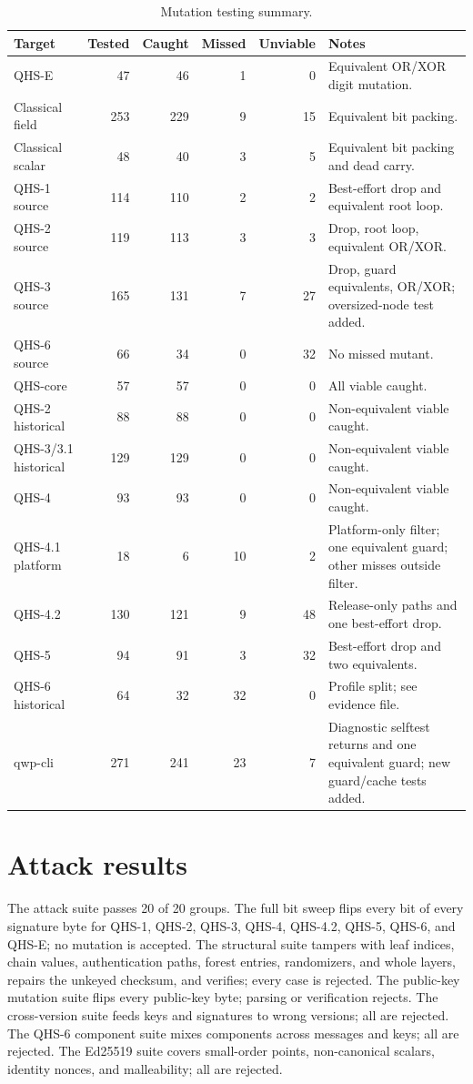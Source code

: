 \documentclass[11pt,a4paper]{article}
\theoremstyle{remark}
\begin{document}
\begin{table}[ht]
\centering
\caption{Mutation testing summary.}
\label{tab:mutation}
\small
\begin{tabularx}{\textwidth}{@{}l r r r r X@{}}
\toprule
Target & Tested & Caught & Missed & Unviable & Notes\\
\midrule
QHS-E & 47 & 46 & 1 & 0 & Equivalent OR/XOR digit mutation.\\
Classical field & 253 & 229 & 9 & 15 & Equivalent bit packing.\\
Classical scalar & 48 & 40 & 3 & 5 & Equivalent bit packing and dead carry.\\
QHS-1 source & 114 & 110 & 2 & 2 & Best-effort drop and equivalent root loop.\\
QHS-2 source & 119 & 113 & 3 & 3 & Drop, root loop, equivalent OR/XOR.\\
QHS-3 source & 165 & 131 & 7 & 27 & Drop, guard equivalents, OR/XOR; oversized-node test added.\\
QHS-6 source & 66 & 34 & 0 & 32 & No missed mutant.\\
QHS-core & 57 & 57 & 0 & 0 & All viable caught.\\
QHS-2 historical & 88 & 88 & 0 & 0 & Non-equivalent viable caught.\\
QHS-3/3.1 historical & 129 & 129 & 0 & 0 & Non-equivalent viable caught.\\
QHS-4 & 93 & 93 & 0 & 0 & Non-equivalent viable caught.\\
QHS-4.1 platform & 18 & 6 & 10 & 2 & Platform-only filter; one equivalent guard; other misses outside filter.\\
QHS-4.2 & 130 & 121 & 9 & 48 & Release-only paths and one best-effort drop.\\
QHS-5 & 94 & 91 & 3 & 32 & Best-effort drop and two equivalents.\\
QHS-6 historical & 64 & 32 & 32 & 0 & Profile split; see evidence file.\\
qwp-cli & 271 & 241 & 23 & 7 & Diagnostic selftest returns and one equivalent guard; new guard/cache tests added.\\
\bottomrule
\end{tabularx}
\end{table}

\section{Attack results}

The attack suite passes 20 of 20 groups. The full bit sweep flips every bit of
every signature byte for QHS-1, QHS-2, QHS-3, QHS-4, QHS-4.2, QHS-5, QHS-6, and
QHS-E; no mutation is accepted. The structural suite tampers with leaf indices,
chain values, authentication paths, forest entries, randomizers, and whole
layers, repairs the unkeyed checksum, and verifies; every case is rejected. The
public-key mutation suite flips every public-key byte; parsing or verification
rejects. The cross-version suite feeds keys and signatures to wrong versions; all
are rejected. The QHS-6 component suite mixes components across messages and
keys; all are rejected. The Ed25519 suite covers small-order points,
non-canonical scalars, identity nonces, and malleability; all are rejected.
\end{document}
